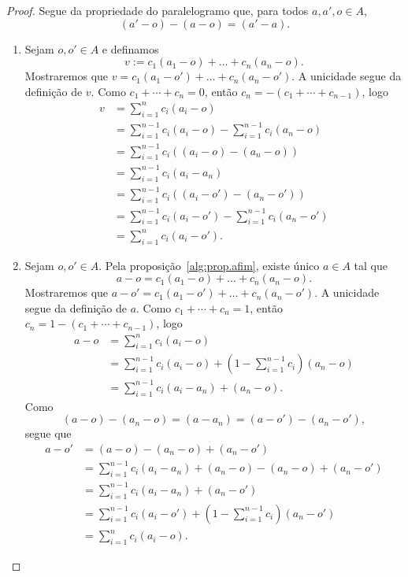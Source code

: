 \begin{proof}
Segue da propriedade do paralelogramo que, para todos $a,a',o \in A$,
	\begin{equation*}
		(a'-o) - (a-o) = (a'-a).
	\end{equation*}
	\begin{enumerate}
		\item Sejam $o,o' \in A$ e definamos
			\begin{equation*}
				v := c_1(a_1-o) + \ldots + c_n(a_n-o).
			\end{equation*}
		Mostraremos que $v = c_1(a_1-o') + \ldots + c_n(a_n-o')$. A unicidade segue da definição de $v$. Como $c_1+\cdots+c_n = 0$, então $c_n = -(c_1+\cdots+c_{n-1})$, logo
			\begin{align*}
				v &= \sum_{i=1}^{n} c_i(a_i-o) \\
					&= \sum_{i=1}^{n-1} c_i(a_i-o) - \sum_{i=1}^{n-1} c_i (a_n-o) \\
					&= \sum_{i=1}^{n-1} c_i((a_i-o) - (a_n-o)) \\
					&= \sum_{i=1}^{n-1} c_i(a_i-a_n) \\
					&= \sum_{i=1}^{n-1} c_i((a_i-o') - (a_n-o')) \\
					&= \sum_{i=1}^{n-1} c_i(a_i-o') - \sum_{i=1}^{n-1} c_i (a_n-o') \\
					&= \sum_{i=1}^{n} c_i(a_i-o').
			\end{align*}
		
		\item Sejam $o,o' \in A$. Pela proposição~\ref{alg:prop.afim}, existe único $a \in A$ tal que
			\begin{equation*}
				a-o = c_1(a_1-o) + \ldots + c_n(a_n-o).
			\end{equation*}
		Mostraremos que $a-o' = c_1(a_1-o') + \ldots + c_n(a_n-o')$. A unicidade segue da definição de $a$. Como $c_1+\cdots+c_n = 1$, então $c_n = 1-(c_1+\cdots+c_{n-1})$, logo
			\begin{align*}
				a-o &= \sum_{i=1}^{n} c_i(a_i-o) \\
					&= \sum_{i=1}^{n-1} c_i(a_i-o) + \left( 1-\sum_{i=1}^{n-1} c_i \right)(a_n-o) \\
					&= \sum_{i=1}^{n-1} c_i(a_i-a_n) + (a_n-o).
			\end{align*}
		Como
			\begin{equation*}
				(a-o) - (a_n-o) = (a-a_n) = (a-o') - (a_n-o'),
			\end{equation*}
		segue que
			\begin{align*}
				a-o' &= (a-o) - (a_n-o) + (a_n-o') \\
					&= \sum_{i=1}^{n-1} c_i(a_i-a_n) + (a_n-o) - (a_n-o) + (a_n-o') \\
					&= \sum_{i=1}^{n-1} c_i(a_i-a_n) + (a_n-o') \\
					&= \sum_{i=1}^{n-1} c_i(a_i-o') + \left( 1-\sum_{i=1}^{n-1} c_i \right)(a_n-o') \\
					&= \sum_{i=1}^{n} c_i(a_i-o).
			\end{align*}
	\end{enumerate}
\end{proof}

